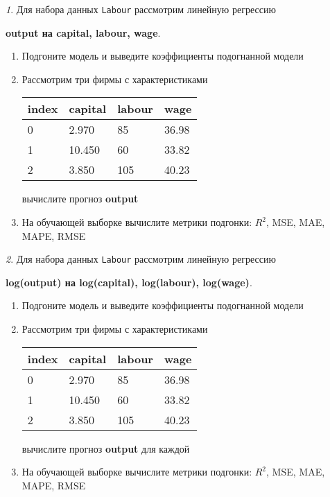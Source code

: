 \documentclass[12pt]{article}
\theoremstyle{remark}
\newtheorem{exercise}{}[section]
\begin{document}
\begin{exercise}
Для набора данных \texttt{Labour} рассмотрим линейную регрессию 
\begin{center}
	\textbf{output на capital, labour, wage}.
\end{center}
\begin{enumerate}
	\item Подгоните модель и выведите коэффициенты подогнанной модели
	\item Рассмотрим три фирмы с характеристиками
	\begin{center}
		\begin{tabular}{|l||l|l|l|}\hline
			index & capital & labour & wage \\ \hline\hline
			0 & 2.970 & 85 & 36.98\\
			1 & 10.450 & 60 & 33.82  \\
			2 & 3.850 & 105 & 40.23\\ \hline
		\end{tabular}
	\end{center}
	вычислите прогноз \textbf{output}
	\item На обучающей выборке вычислите метрики подгонки: \(R^2\), 
	MSE, MAE, MAPE, RMSE
\end{enumerate}
\end{exercise}

\begin{exercise}
Для набора данных \texttt{Labour} рассмотрим линейную регрессию 
\begin{center}
	\textbf{log(output) на log(capital), log(labour), log(wage)}.
\end{center}
\begin{enumerate}
	\item Подгоните модель и выведите коэффициенты подогнанной модели
	\item Рассмотрим три фирмы с характеристиками
	\begin{center}
		\begin{tabular}{|l||l|l|l|}\hline
			index & capital & labour & wage \\ \hline\hline
			0 & 2.970 & 85 & 36.98\\
			1 & 10.450 & 60 & 33.82  \\
			2 & 3.850 & 105 & 40.23\\ \hline
		\end{tabular}
	\end{center}
	вычислите прогноз \textbf{output} для каждой
	\item На обучающей выборке вычислите метрики подгонки: \(R^2\), 
	MSE, MAE, MAPE, RMSE
\end{enumerate}
\end{exercise}
\end{document}
